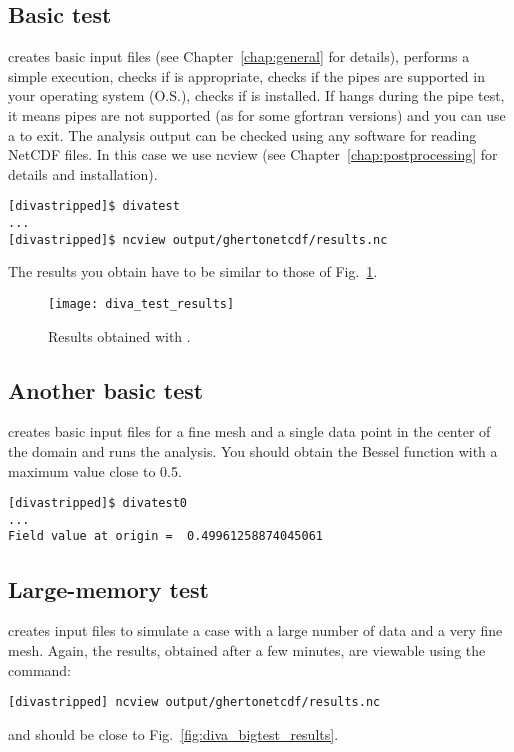 \subsection{Basic test}

 creates basic input files (see Chapter~\ref{chap:general} for details), performs a simple \diva execution,
checks if  is appropriate, checks if the pipes are supported in your operating system (O.S.), checks if 
is installed.
If  hangs during the pipe test, it means pipes are not supported (as for some gfortran versions) 
and you can use a  to exit. The analysis output can be checked using any software for reading 
NetCDF files. In this case we use ncview (see Chapter~\ref{chap:postprocessing} for details and installation). 

\begin{lstlisting}[style=Bash]
[divastripped]$ divatest
...
[divastripped]$ ncview output/ghertonetcdf/results.nc
\end{lstlisting}
The results you obtain have to be similar to those of Fig.~\ref{fig:diva_test_results}.

\begin{figure}[H]
\centering 
\texttt{[image: diva\_test\_results]}
\caption{Results obtained with .\label{fig:diva_test_results}}
\end{figure}


\subsection{Another basic test}

 creates basic input files for a fine mesh and a single data point in the center of the domain and runs the analysis. You should obtain the  Bessel function with a maximum value close to 0.5.

\begin{lstlisting}[style=Bash]
[divastripped]$ divatest0
...
Field value at origin =  0.49961258874045061
\end{lstlisting}


\subsection{Large-memory test}

 creates input files to simulate a case with a large number of data and a very fine mesh. Again, the results, obtained after a few minutes, are viewable using the command:
\begin{lstlisting}[style=Bash]
[divastripped] ncview output/ghertonetcdf/results.nc
\end{lstlisting}
and should be close to Fig.~\ref{fig:diva_bigtest_results}.

